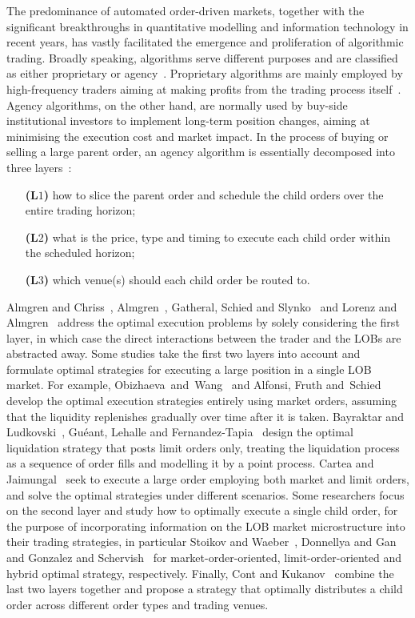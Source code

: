 \documentclass{amsart}[11pt]
\numberwithin{equation}{section}
\theoremstyle{definition}
\begin{document}
The predominance of automated order-driven markets, 
together with the significant breakthroughs in quantitative modelling and information technology in recent years, has vastly facilitated the emergence and proliferation of algorithmic trading.
Broadly speaking, algorithms serve different purposes and are classified as either proprietary or agency~\cite{hasbrouck2013low}.
Proprietary algorithms are mainly employed by high-frequency traders
aiming at making profits from the trading process itself~\cite{hagstromer2013diversity, menkveld2016economics, securities2014equity}.
Agency algorithms, on the other hand, are normally used by buy-side institutional investors to implement long-term position changes,
aiming at minimising the execution cost and market impact.
In the process of buying or selling a large parent order,
an agency algorithm is essentially decomposed into three layers~: 
\begin{enumerate}
\item [\textbf{(L$1$)}]
how to slice the parent order and schedule the child orders over the entire trading horizon;
\item [\textbf{(L$2$)}]
what is the price, type and timing to execute each child order within the scheduled horizon;
\item [\textbf{(L$3$)}]
which venue(s) should each child order be routed to.
\end{enumerate}
Almgren and Chriss~\cite{almgren2001optimal}, 
Almgren~\cite{almgren2003optimal}, 
Gatheral, Schied and Slynko~\cite{gatheral2012transient}
and 
Lorenz and Almgren~\cite{lorenz2011mean}
address the optimal execution problems by solely considering the first layer, 
in which case the direct interactions between the trader and the LOBs are abstracted away.
Some studies take the first two layers into account and
formulate optimal strategies for executing a large position in a single LOB market.
For example, Obizhaeva~and~Wang~\cite{obizhaeva2013optimal}
and Alfonsi, Fruth and~Schied~\cite{alfonsi2010optimal}
develop the optimal execution strategies entirely using market orders, 
assuming that the liquidity replenishes gradually over time after it is taken.
Bayraktar and Ludkovski~\cite{bayraktar2014liquidation},
Gu{\'e}ant, Lehalle and Fernandez-Tapia~\cite{gueant2012optimal}
design the optimal liquidation strategy that posts limit orders only, 
treating the liquidation process as a sequence of order fills and modelling it by a point process.
Cartea and Jaimungal~\cite{cartea2015optimal} seek to execute a large order employing both market and limit orders,
and solve the optimal strategies under different scenarios.
Some researchers focus on the second layer and study how to optimally execute a single child order,
for the purpose of incorporating information on the LOB market microstructure into their trading strategies,
in particular Stoikov and Waeber~\cite{stoikov2012optimal},
Donnellya and Gan~\cite{donnelly2017optimal}
and
Gonzalez and Schervish~\cite{gonzalez2017instantaneous}
for market-order-oriented, limit-order-oriented and hybrid optimal strategy, respectively. 
Finally, Cont and Kukanov~\cite{cont2017optimal} 
combine the last two layers together 
and propose a strategy that optimally distributes a child order across different order types and trading venues.
\end{document}
